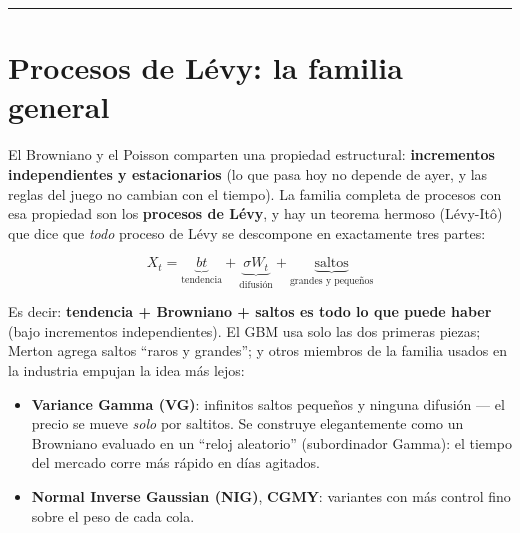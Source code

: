 \documentclass[
  spanish,
  letterpaper,
  DIV=11,
  numbers=noendperiod]{scrreprt}
\providecommand{\tightlist}{%
  \setlength{\itemsep}{0pt}\setlength{\parskip}{0pt}}
\begin{document}
\begin{center}\rule{0.5\linewidth}{0.5pt}\end{center}

\chapter{Procesos de Lévy: la familia
general}\label{procesos-de-luxe9vy-la-familia-general}

El Browniano y el Poisson comparten una propiedad estructural:
\textbf{incrementos independientes y estacionarios} (lo que pasa hoy no
depende de ayer, y las reglas del juego no cambian con el tiempo). La
familia completa de procesos con esa propiedad son los \textbf{procesos
de Lévy}, y hay un teorema hermoso (Lévy-Itô) que dice que \emph{todo}
proceso de Lévy se descompone en exactamente tres partes:

\[X_t = \underbrace{bt}_{\text{tendencia}} + \underbrace{\sigma W_t}_{\text{difusión}} + \underbrace{\text{saltos}}_{\text{grandes y pequeños}}\]

Es decir: \textbf{tendencia + Browniano + saltos es todo lo que puede
haber} (bajo incrementos independientes). El GBM usa solo las dos
primeras piezas; Merton agrega saltos ``raros y grandes''; y otros
miembros de la familia usados en la industria empujan la idea más lejos:

\begin{itemize}
\tightlist
\item
  \textbf{Variance Gamma (VG)}: infinitos saltos pequeños y ninguna
  difusión --- el precio se mueve \emph{solo} por saltitos. Se construye
  elegantemente como un Browniano evaluado en un ``reloj aleatorio''
  (subordinador Gamma): el tiempo del mercado corre más rápido en días
  agitados.
\item
  \textbf{Normal Inverse Gaussian (NIG)}, \textbf{CGMY}: variantes con
  más control fino sobre el peso de cada cola.
\end{itemize}
\end{document}
